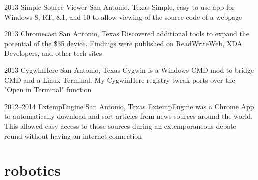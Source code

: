 \documentclass[]{friggeri-cv} %
\begin{document}
\begin{entrylist}
	\entry
	{2013}
	{Simple Source Viewer}
	{San Antonio, Texas}
	{Simple, easy to use app for Windows 8, RT, 8.1, and 10 to allow viewing of the source code of a webpage}


	\entry
	{2013}
	{Chromecast}
	{San Antonio, Texas}
	{Discovered additional tools to expand the potential of the \$35 device. Findings were published on ReadWriteWeb, XDA Developers, and other tech sites}


	\entry
	{2013}
	{CygwinHere}
	{San Antonio, Texas}
	{Cygwin is a Windows CMD mod to bridge CMD and a Linux Terminal. My CygwinHere registry tweak ports over the "Open in Terminal" function}


	\entry
	{2012--2014}
	{ExtempEngine}
	{San Antonio, Texas}
	{ExtempEngine was a Chrome App to automatically download and sort articles from news sources around the world. This allowed easy access to those sources during an extemporaneous debate round without having an internet connection}

\end{entrylist}


\section{robotics}
\end{document}
